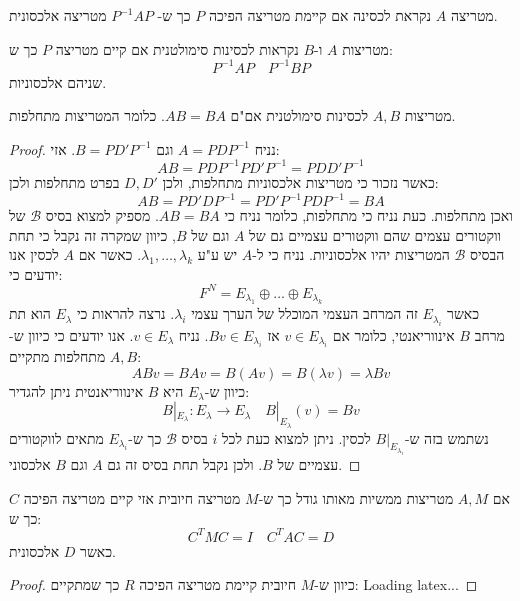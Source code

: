 \documentclass{tstextbook}
\begin{document}
\begin{reminder}
מטריצה \(A\) נקראת לכסינה אם קיימת מטריצה הפיכה \(P\) כך ש- \(P ^{-1} A P\) מטריצה אלכסונית.

\end{reminder}
\begin{definition}
מטריצות \(A\) ו-\(B\) נקראות לכסינות סימולטנית אם קיים מטריצה \(P\) כך ש:
$$P ^{-1} A P\quad P ^{-1} B P$$
שניהם אלכסוניות.

\end{definition}
\begin{proposition}
מטריצות \(A,B\) לכסינות סימולטנית אם"ם \(AB=BA\). כלומר המטריצות מתחלפות.

\end{proposition}
\begin{proof}
נניח \(A=P D P ^{-1}\) וגם \(B=P D' P ^{-1}\). אזי:
$$AB=PDP ^{-1} P D' P ^{-1} = P D D' P ^{-1}$$
כאשר נזכור כי מטריצות אלכסוניות מתחלפות, ולכן \(D, D'\) בפרט מתחלפות ולכן:
$$AB=PD' D P ^{-1}= PD' P ^{-1} P D P ^{-1}=BA$$
ואכן מתחלפות.
כעת נניח כי מתחלפות, כלומר נניח כי \(AB=BA\). מספיק למצוא בסיס \(\mathcal{B}\) של ווקטורים עצמים שהם ווקטורים עצמיים גם של \(A\) וגם של \(B\), כיוון שמקרה זה נקבל כי תחת הבסיס \(\mathcal{B}\) המטריצות יהיו אלכסוניות. נניח כי ל-\(A\) יש ע"ע \(\lambda_{1},\dots,\lambda_{k}\). כאשר אם \(A\) לכסין אנו יודעים כי:
$$F^{N}= E_{\lambda_{1}}\oplus \dots \oplus E_{\lambda_{k}}$$
כאשר \(E_{\lambda_{i}}\) זה המרחב העצמי המוכלל של הערך עצמי \(\lambda_{i}\). 
נרצה להראות כי \(E_{\lambda}\) הוא תת מרחב \(B\) אינווריאנטי, כלומר אם \(v \in E_{\lambda_{i}}\) אז \(Bv \in E_{\lambda_{i}}\).
נניח \(v \in E_{\lambda}\). אנו יודעים כי כיוון ש-\(A,B\) מתחלפות מתקיים:
$$ABv = BAv=B(Av)=B\left( \lambda v \right)=\lambda Bv$$
כיוון ש-\(E_{\lambda}\) היא \(B\) אינווריאנטית ניתן להגדיר:
$$B|_{E_{\lambda}}:E_{\lambda}\to E_{\lambda}\quad B|_{E_{\lambda}}(v)=Bv$$
נשתמש בזה ש-\(B|_{E_{\lambda_{i}}}\) לכסין. ניתן למצוא כעת לכל \(i\) בסיס \(\mathcal{ B}\) כך ש-\(E_{\lambda_{i}}\) מתאים לווקטורים עצמיים של \(B\). ולכן נקבל תחת בסיס זה גם \(A\) וגם \(B\) אלכסוני.

\end{proof}
\begin{proposition}
אם \(A,M\) מטריצות ממשיות מאותו גודל כך ש-\(M\) מטריצה חיובית אזי קיים מטריצה הפיכה \(C\) כך ש:
$$C^{T}MC=I\quad C^{T}AC = D$$
כאשר \(D\) אלכסונית.

\end{proposition}
\begin{proof}
כיוון ש-\(M\) חיובית קיימת מטריצה הפיכה \(R\) כך שמתקיים:
Loading latex...

\end{proof}
\end{document}
